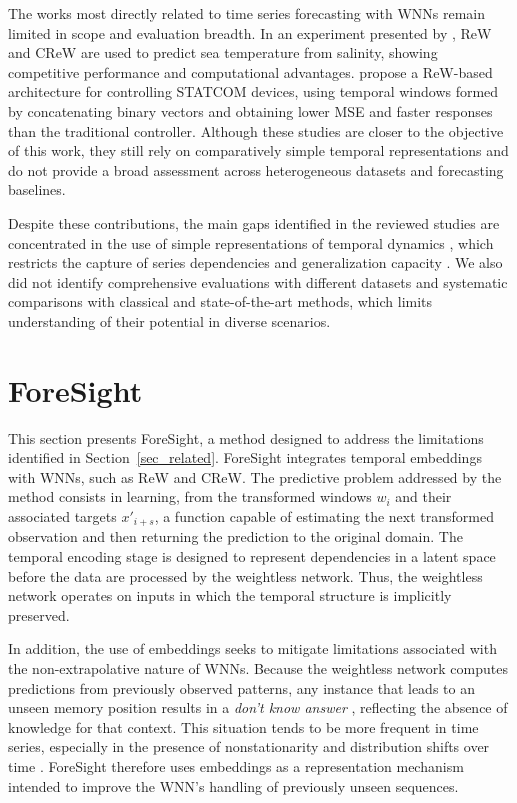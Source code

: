 \documentclass[final,3p,times,twocolumn,authoryear]{elsarticle}
\begin{document}
The works most directly related to time series forecasting with WNNs remain limited in scope and evaluation breadth. In an experiment presented by \citet{lusquino_extending_2020}, ReW and CReW are used to predict sea temperature from salinity, showing competitive performance and computational advantages. \citet{rocha_regression_2020} propose a ReW-based architecture for controlling STATCOM devices, using temporal windows formed by concatenating binary vectors and obtaining lower MSE and faster responses than the traditional controller. Although these studies are closer to the objective of this work, they still rely on comparatively simple temporal representations and do not provide a broad assessment across heterogeneous datasets and forecasting baselines.

Despite these contributions, the main gaps identified in the reviewed studies are concentrated in the use of simple representations of temporal dynamics \citep{desouza_fast_2011, alhassan_using_2011, lusquino_extending_2020, rocha_regression_2020, katopodis_functional_2022}, which restricts the capture of series dependencies and generalization capacity \citep{baby_cawnn_2026}. We also did not identify comprehensive evaluations with different datasets and systematic comparisons with classical and state-of-the-art methods, which limits understanding of their potential in diverse scenarios.


\section{ForeSight}
\label{sec_foresight}


This section presents ForeSight, a method designed to address the limitations identified in Section~\ref{sec_related}.
ForeSight integrates temporal embeddings with WNNs, such as ReW and CReW. The predictive problem addressed by the method consists in learning, from the transformed windows $w_i$ and their associated targets $x'_{i+s}$, a function capable of estimating the next transformed observation and then returning the prediction to the original domain. The temporal encoding stage is designed to represent dependencies in a latent space before the data are processed by the weightless network. Thus, the weightless network operates on inputs in which the temporal structure is implicitly preserved.

In addition, the use of embeddings seeks to mitigate limitations associated with the non-extrapolative nature of WNNs. Because the weightless network computes predictions from previously observed patterns, any instance that leads to an unseen memory position results in a \textit{don't know answer} \citep{lusquino_extending_2020}, reflecting the absence of knowledge for that context. This situation tends to be more frequent in time series, especially in the presence of nonstationarity and distribution shifts over time \citep{ogasawara_event_2025}. ForeSight therefore uses embeddings as a representation mechanism intended to improve the WNN's handling of previously unseen sequences.
\end{document}
